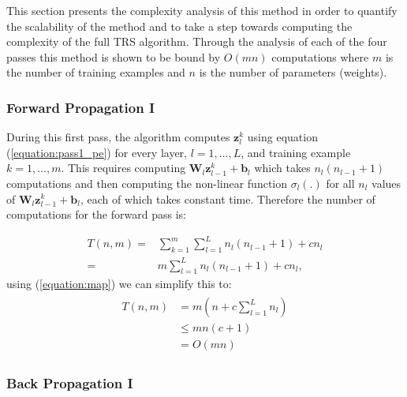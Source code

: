 \documentclass[letterpaper,12pt,titlepage,oneside,final]{book}
\begin{document}
	This section presents the complexity analysis of this method in order to quantify the scalability of the method and to take a step towards computing the complexity of the full TRS algorithm. Through the analysis of each of the four passes this method is shown to be bound by $O(mn)$ computations where $m$ is the number of training examples and $n$ is the number of parameters (weights). 
	
	\subsubsection{Forward Propagation I}
	
	During this first pass, the algorithm computes $\mathbf{z}_{l}^{k}$ using equation (\ref{equation:pass1_pe}) for every layer, $l=1,...,L$, and training example $k=1,...,m$. This requires computing $\mathbf{W}_{l}\mathbf{z}^{k}_{l-1} + \mathbf{b}_{l}$ which takes $n_{l}(n_{l-1} + 1)$ computations and then computing the non-linear function $\sigma_{l}(.)$ for all $n_{l}$ values of $\mathbf{W}_{l}\mathbf{z}^{k}_{l-1} + \mathbf{b}_{l}$, each of which takes constant time. Therefore the number of computations for the forward pass is:
	
	\begin{equation}
	\begin{split}
	T(n,m) = & \sum_{k=1}^{m}{\sum_{l=1}^{L}{n_{l}(n_{l-1} + 1) + cn_{l}}} \\
	= & m\sum_{l=1}^{L}{n_{l}(n_{l-1}+1) + cn_{l}},
	\end{split}
	\end{equation}
	using (\ref{equation:map}) we can simplify this to:
	\begin{align}
	\begin{split}
	T(n,m) & = m(n + c\sum_{l=1}^{L}{n_{l}}) \\
	& \leq mn(c + 1) \\
	& = O(mn)
	\end{split}
	\end{align}
	
	
	
	\subsubsection{Back Propagation I}
	
\end{document}
